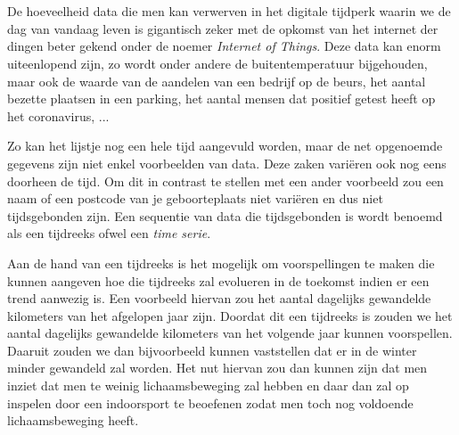 
\chapter{}
\label{ch:inleiding}


De hoeveelheid data die men kan verwerven in het digitale tijdperk waarin we de dag van vandaag leven is gigantisch zeker met de opkomst van het internet der dingen beter gekend onder de noemer \textit{Internet of Things}. Deze data kan enorm uiteenlopend zijn, zo wordt onder andere de buitentemperatuur bijgehouden, maar ook de waarde van de aandelen van een bedrijf op de beurs, het aantal bezette plaatsen in een parking, het aantal mensen dat positief getest heeft op het coronavirus, ...

Zo kan het lijstje nog een hele tijd aangevuld worden, maar de net opgenoemde gegevens zijn niet enkel voorbeelden van data. Deze zaken vari\"{e}ren ook nog eens doorheen de tijd. Om dit in contrast te stellen met een ander voorbeeld zou een naam of een postcode van je geboorteplaats niet vari\"{e}ren en dus niet tijdsgebonden zijn. Een sequentie van data die tijdsgebonden is wordt benoemd als een tijdreeks ofwel een \textit{time serie}. 

Aan de hand van een tijdreeks is het mogelijk om voorspellingen te maken die kunnen aangeven hoe die tijdreeks zal evolueren in de toekomst indien er een trend aanwezig is. Een voorbeeld hiervan zou het aantal dagelijks gewandelde kilometers van het afgelopen jaar zijn. Doordat dit een tijdreeks is zouden we het aantal dagelijks gewandelde kilometers van het volgende jaar kunnen voorspellen. Daaruit zouden we dan bijvoorbeeld kunnen vaststellen dat er in de winter minder gewandeld zal worden. Het nut hiervan zou dan kunnen zijn dat men inziet dat men te weinig lichaamsbeweging zal hebben en daar dan zal op inspelen door een indoorsport te beoefenen zodat men toch nog voldoende lichaamsbeweging heeft. 

